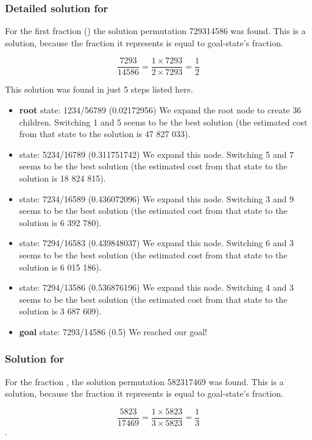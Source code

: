 \documentclass{article}
\begin{document}
\subsubsection{Detailed solution for }

For the first fraction () the solution permutation 729314586 was
found. This is a solution, because the fraction it represents is equal to
goal-state's fraction.

\[\frac{7293}{14586} = \frac{1 \times 7293}{2 \times 7293} =
\frac{1}{2}\]

This solution was found in just 5 steps listed here.

\begin{itemize}
  \item \textbf{root} state: 1234/56789 (0.02172956)
  We expand the root node to create 36 children.
  Switching 1 and 5 seems to be the best solution (the estimated cost from
  that state to the solution is 47 827 033).
  \item state: 5234/16789 (0.311751742)
  We expand this node.
  Switching 5 and 7 seems to be the best solution (the estimated cost from
  that state to the solution is 18 824 815).
  \item state: 7234/16589 (0.436072096)
  We expand this node.
  Switching 3 and 9 seems to be the best solution (the estimated cost from
  that state to the solution is 6 392 780).
  \item state: 7294/16583 (0.439848037)
  We expand this node.
  Switching 6 and 3 seems to be the best solution (the estimated cost from
  that state to the solution is 6 015 186).
  \item state: 7294/13586 (0.536876196)
  We expand this node.
  Switching 4 and 3 seems to be the best solution (the estimated cost from
  that state to the solution is 3 687 609).
  \item \textbf{goal} state: 7293/14586 (0.5)
  We reached our goal!
\end{itemize}

\subsubsection{Solution for }

For the fraction , the solution permutation 582317469 was
found. This is a solution, because the fraction it represents is equal to
goal-state's fraction.

\[\frac{5823}{17469} = \frac{1 \times 5823}{3 \times 5823} =
\frac{1}{3}\].
\end{document}
